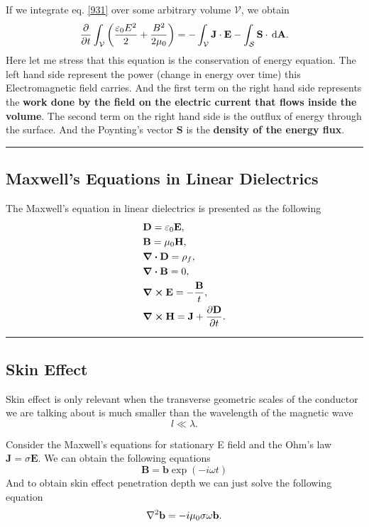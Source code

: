 \documentclass[12pt,english]{article}
\newcommand{\dmr}[1]{\, \mathrm{d}#1} %
\numberwithin{equation}{subsection}
\renewcommand{\vec}[1]{\mathbf{#1}}
\begin{document}
If we integrate eq. \ref{931} over some arbitrary volume $\mathcal{V}$, we obtain
\begin{equation}
    \pdv{}{t} \int_{\mathcal{V}} \left(\frac{\varepsilon_0 E^2}{2} + \frac{B^2}{2\mu_0}\right) = -\int_{\mathcal{V}} \vec{J} \cdot \vec{E} - \int_{\mathcal{S}} \vec{S}\cdot\dmr{\vec{A}}.
\end{equation}
Here let me stress that this equation is the conservation of energy equation. The left hand side represent the power (change in energy over time) this Electromagnetic field carries. And the first term on the right hand side represents the \textbf{work done by the field on the electric current that flows inside the volume}. The second term on the right hand side is the outflux of energy through the surface. And the Poynting's vector $\vec{S}$ is the \textbf{density of the energy flux}.

\par\noindent\rule{\textwidth}{0.4pt}
\subsection{Maxwell's Equations in Linear Dielectrics}
The Maxwell's equation in linear dielectrics is presented as the following
\begin{align}
    &\vec{D} = \varepsilon_0 \vec{E},\\
    &\vec{B} = \mu_0 \vec{H},\\
    &\div \vec{D} = \rho_f,\\
    &\div \vec{B} = 0,\\
    &\curl \vec{E} = -\frac{\vec{B}}{t},\\
    &\curl \vec{H} = \vec{J} + \pdv{\vec{D}}{t}.
\end{align}

\par\noindent\rule{\textwidth}{0.4pt}
\subsection{Skin Effect}
Skin effect is only relevant when the transverse geometric scales of the conductor we are talking about is much smaller than the wavelength of the magnetic wave
\begin{equation}
    l \ll \lambda.
\end{equation}

Consider the Maxwell's equations for stationary E field and the Ohm's law $\vec{J} = \sigma \vec{E}$. We can obtain the following equations
\begin{equation}
    \vec{B} = \vec{b}\exp(-i\omega t)
\end{equation}
And to obtain skin effect penetration depth we can just solve the following equation
\begin{equation}
    \laplacian \vec{b} = -i \mu_0 \sigma \omega \vec{b}.
\end{equation}
\end{document}
